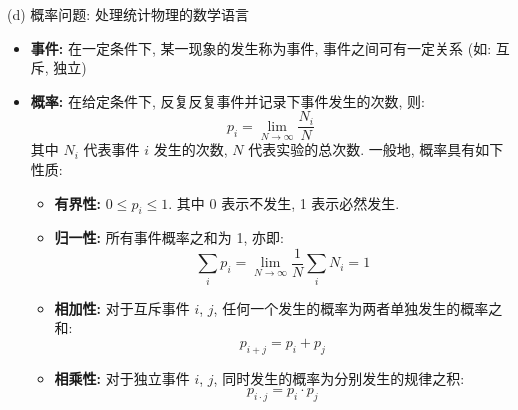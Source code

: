 (d) 概率问题: 处理统计物理的数学语言
\begin{itemize}
    \item \textbf{事件:} 在一定条件下, 某一现象的发生称为事件, 事件之间可有一定关系 (如: 互斥, 独立)
    \item \textbf{概率:} 在给定条件下, 反复反复事件并记录下事件发生的次数, 则:
        \begin{equation}
            p_i = \lim_{N \rightarrow \infty} \dfrac{N_i}{N}
        \end{equation}
        其中 $ N_i $ 代表事件 $ i $ 发生的次数, $ N $ 代表实验的总次数. 一般地, 概率具有如下性质:

        \begin{itemize}
            \item \textbf{有界性:} $ 0 \leq p_i \leq 1 $. 其中 0 表示不发生, 1 表示必然发生.
            \item \textbf{归一性:} 所有事件概率之和为 1, 亦即:
                \begin{equation}
                    \sum_{i} p_i = \lim_{N \rightarrow \infty} \dfrac{1}{N} \sum_{i} N_i = 1
                \end{equation}
            \item \textbf{相加性:} 对于互斥事件 $ i $, $ j $, 任何一个发生的概率为两者单独发生的概率之和:
                \begin{equation}
                    p_{i + j} = p_i + p_j
                \end{equation}
            \item \textbf{相乘性:} 对于独立事件 $ i $, $ j $, 同时发生的概率为分别发生的规律之积:
                \begin{equation}
                    p_{i \cdot j} = p_i \cdot p_j
                \end{equation}
        \end{itemize}
\end{itemize}
